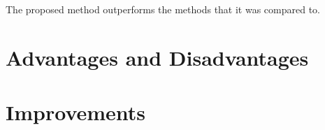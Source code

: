 \documentclass[]{article}
\begin{document}
The proposed method outperforms the methods that it was compared to.

\section{Advantages and Disadvantages}






\section{Improvements}




\clearpage


\end{document}
